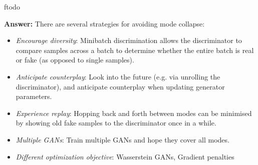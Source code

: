 ƒtodo\documentclass{article}
\newenvironment{QandA}{\begin{enumerate}[label=\arabic*.]}{\end{enumerate}}
\newenvironment{InnerQandA}{\begin{enumerate}[label=\roman*.]}{\end{enumerate}}
\newenvironment{answer}{\par\normalfont \textbf{Answer:}}{}
\begin{document}
\begin{QandA}
\begin{InnerQandA}
\begin{answer}
            There are several strategies for avoiding mode collapse:
            \begin{itemize}
                \item \textit{Encourage diversity}: Minibatch discrimination allows the discriminator to compare samples across a batch to determine whether the entire batch is real or fake (as opposed to single samples).
                \item \textit{Anticipate counterplay}: Look into the future (e.g. via unrolling the discriminator), and anticipate counterplay when updating generator parameters.
                \item \textit{Experience replay}: Hopping back and forth between modes can be minimised by showing old fake samples to the discriminator once in a while.
                \item \textit{Multiple GANs}: Train multiple GANs and hope they cover all modes.
                \item \textit{Different optimization objective}: Wasserstein GANs, Gradient penalties
            \end{itemize}
        \end{answer}
    \end{InnerQandA}
\end{QandA}
\end{document}
